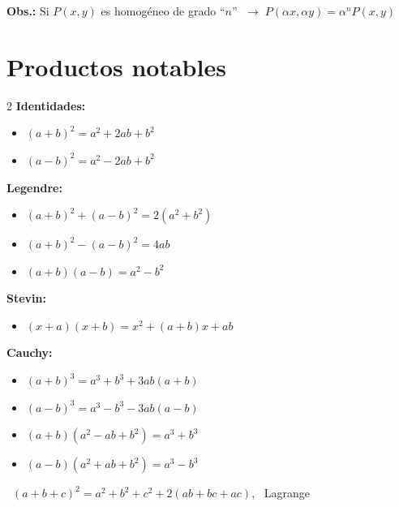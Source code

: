 \documentclass[11pt,a4paper]{article}
\newcommand{\cn}[1]{\raisebox{.5pt}{\textcircled{\raisebox{-.9pt}{\scriptsize #1}}}}
\begin{document}
\medskip
\textcolor{naranja}{\textbf{Obs.:}} Si $P(x,y)$ es homogéneo de grado ``$n$''
$\;\longrightarrow\; \boxed{P(\alpha x, \alpha y) = \alpha^n P(x,y)}$

\newpage
\section{Productos notables}

\begin{multicols}{2}
\textbf{\cn{1} Identidades:}
\begin{itemize}[label=\checkmark]
  \item $(a+b)^2 = a^2 + 2ab + b^2$
  \item $(a-b)^2 = a^2 - 2ab + b^2$
\end{itemize}

\textbf{\cn{2} Legendre:}
\begin{itemize}[label=\checkmark]
  \item $(a+b)^2 + (a-b)^2 = 2(a^2+b^2)$
  \item $(a+b)^2 - (a-b)^2 = 4ab$
\end{itemize}

\textbf{\cn{3}}
\begin{itemize}[label=\checkmark]
  \item $(a+b)(a-b) = a^2 - b^2$
\end{itemize}

\textbf{\cn{4} Stevin:}
\begin{itemize}[label=\checkmark]
  \item $(x+a)(x+b) = x^2 + (a+b)x + ab$
\end{itemize}

\textbf{\cn{5} Cauchy:}
\begin{itemize}[label=\checkmark]
  \item $(a+b)^3 = a^3 + b^3 + 3ab(a+b)$
  \item $(a-b)^3 = a^3 - b^3 - 3ab(a-b)$
\end{itemize}

\textbf{\cn{6}}
\begin{itemize}[label=\checkmark]
  \item $(a+b)(a^2 - ab + b^2) = a^3 + b^3$
  \item $(a-b)(a^2 + ab + b^2) = a^3 - b^3$
\end{itemize}
\end{multicols}

\textbf{\cn{7}} \checkmark\ $(a+b+c)^2 = a^2 + b^2 + c^2 + 2(ab + bc + ac)$, \ Lagrange
\end{document}
